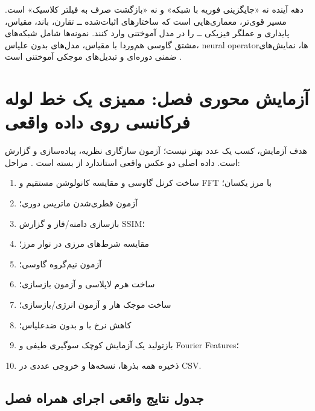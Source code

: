 \begin{futurebox}
دهه آینده نه «جایگزینی فوریه با شبکه» و نه «بازگشت صرف به فیلتر کلاسیک» است. مسیر قوی‌تر، معماری‌هایی
است که ساختارهای اثبات‌شده ــ تقارن، باند، مقیاس، پایداری و عملگر فیزیکی ــ را در مدل آموختنی وارد کنند.
نمونه‌ها شامل شبکه‌های مشتق گاوسی هم‌وردا با مقیاس، مدل‌های بدون علیاس، neural operatorها، نمایش‌های ضمنی
دوره‌ای و تبدیل‌های موجکی آموختنی است \cite{lindeberg2020scale,karras2021aliasfree,li2021fno,sitzmann2020siren}.
\end{futurebox}

\section{آزمایش محوری فصل: ممیزی یک خط لوله فرکانسی روی داده واقعی}

هدف آزمایش، کسب یک عدد بهتر نیست؛ آزمون سازگاری نظریه، پیاده‌سازی و گزارش است. داده اصلی دو عکس واقعی
استاندارد از بسته  است \cite{vanderwalt2014skimage}. مراحل:
\begin{enumerate}
\item ساخت کرنل گاوسی و مقایسه کانولوشن مستقیم و FFT با مرز یکسان؛
\item آزمون قطری‌شدن ماتریس دوری؛
\item بازسازی دامنه/فاز و گزارش SSIM؛
\item مقایسه شرط‌های مرزی در نوار مرز؛
\item آزمون نیم‌گروه گاوسی؛
\item ساخت هرم لاپلاسی و آزمون بازسازی؛
\item ساخت موجک هار و آزمون انرژی/بازسازی؛
\item کاهش نرخ با و بدون ضدعلیاس؛
\item بازتولید یک آزمایش کوچک سوگیری طیفی و Fourier Features؛
\item ذخیره همه بذرها، نسخه‌ها و خروجی عددی در CSV.
\end{enumerate}

\subsection{جدول نتایج واقعی اجرای همراه فصل}

